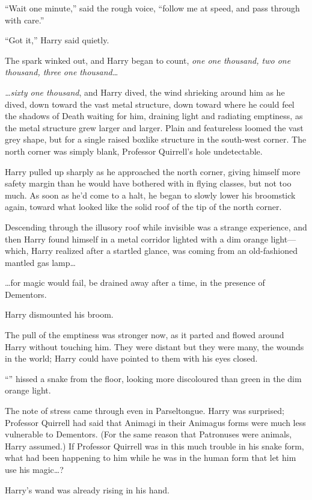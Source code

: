 “Wait one minute,” said the rough voice, “follow me at speed, and pass through with care.”

“Got it,” Harry said quietly.

The spark winked out, and Harry began to count, \emph{one one thousand, two one thousand, three one thousand…}

\emph{…sixty one thousand}, and Harry dived, the wind shrieking around him as he dived, down toward the vast metal structure, down toward where he could feel the shadows of Death waiting for him, draining light and radiating emptiness, as the metal structure grew larger and larger. Plain and featureless loomed the vast grey shape, but for a single raised boxlike structure in the south-west corner. The north corner was simply blank, Professor Quirrell’s hole undetectable.

Harry pulled up sharply as he approached the north corner, giving himself more safety margin than he would have bothered with in flying classes, but not too much. As soon as he’d come to a halt, he began to slowly lower his broomstick again, toward what looked like the solid roof of the tip of the north corner.

Descending through the illusory roof while invisible was a strange experience, and then Harry found himself in a metal corridor lighted with a dim orange light—which, Harry realized after a startled glance, was coming from an old-fashioned mantled gas lamp…

…for magic would fail, be drained away after a time, in the presence of Dementors.

Harry dismounted his broom.

The pull of the emptiness was stronger now, as it parted and flowed around Harry without touching him. They were distant but they were many, the wounds in the world; Harry could have pointed to them with his eyes closed.

“” hissed a snake from the floor, looking more discoloured than green in the dim orange light.

The note of stress came through even in Parseltongue. Harry was surprised; Professor Quirrell had said that Animagi in their Animagus forms were much less vulnerable to Dementors. (For the same reason that Patronuses were animals, Harry assumed.) If Professor Quirrell was in this much trouble in his snake form, what had been happening to him while he was in the human form that let him use his magic…?

Harry’s wand was already rising in his hand.

